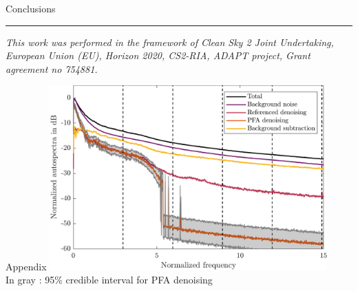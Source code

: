 \documentclass[10pt,xcolor=x11names,compress, show notes]{beamer}%
\begin{document}
\begin{frame}{Conclusions}
\vfill
\begin{center}
	\noindent\rule{\textwidth}{0.4pt}
	\scriptsize \itshape{
	This work was performed in the framework of Clean Sky 2 Joint Undertaking, European Union (EU), Horizon 2020, CS2-RIA, ADAPT project, Grant agreement no 754881.}\\
\end{center}

\end{frame}



\appendix
\setcounter{finalframe}{\value{framenumber}}

\begin{frame}{Appendix}
\centering
\includegraphics[width=0.8\textwidth]{ic_95pc.png}\\
In gray : 95\% credible interval for PFA denoising
\end{frame}
\setcounter{framenumber}{\value{finalframe}}
\end{document}
